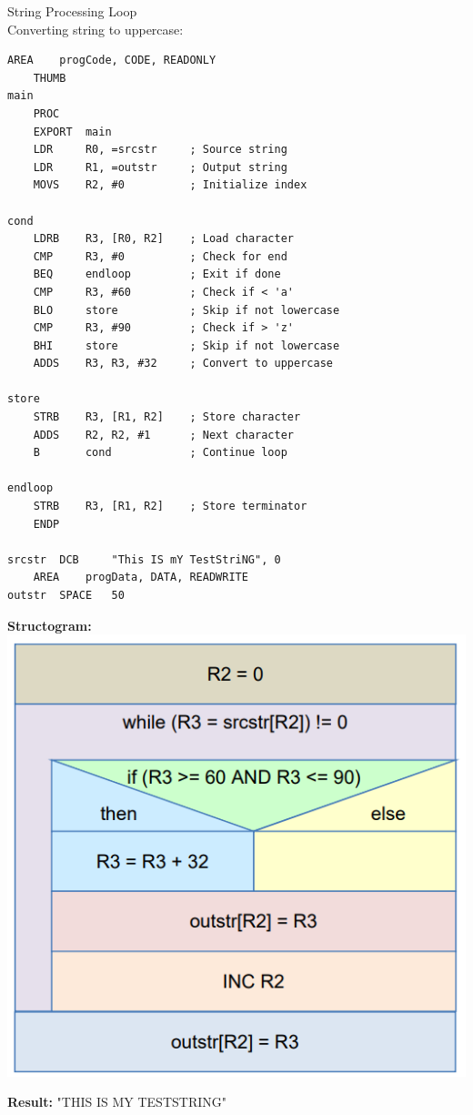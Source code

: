 \begin{example2}{String Processing Loop}\\
Converting string to uppercase:
\begin{lstlisting}[language=armasm, style=basesmol]
    AREA    progCode, CODE, READONLY
    THUMB
main
    PROC
    EXPORT  main
    LDR     R0, =srcstr     ; Source string
    LDR     R1, =outstr     ; Output string
    MOVS    R2, #0          ; Initialize index
    
cond
    LDRB    R3, [R0, R2]    ; Load character
    CMP     R3, #0          ; Check for end
    BEQ     endloop         ; Exit if done
    CMP     R3, #60         ; Check if < 'a'
    BLO     store           ; Skip if not lowercase
    CMP     R3, #90         ; Check if > 'z'
    BHI     store           ; Skip if not lowercase
    ADDS    R3, R3, #32     ; Convert to uppercase
    
store
    STRB    R3, [R1, R2]    ; Store character
    ADDS    R2, R2, #1      ; Next character
    B       cond            ; Continue loop
    
endloop
    STRB    R3, [R1, R2]    ; Store terminator
    ENDP
    
srcstr  DCB     "This IS mY TestStriNG", 0
    AREA    progData, DATA, READWRITE
outstr  SPACE   50
\end{lstlisting}

\textbf{Structogram:}\\
\includegraphics[width=0.8\linewidth]{images/structogramstringstuff.png}

\textbf{Result:} "THIS IS MY TESTSTRING"
\end{example2}
